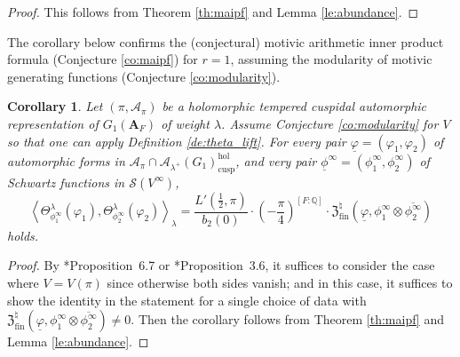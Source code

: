 \documentclass[12pt]{amsart}
\numberwithin{equation}{section}
\theoremstyle{plain}
\newtheorem{corollary}[proposition]{Corollary}
\theoremstyle{definition}
\theoremstyle{remark}
\renewcommand{\b}[1]{\mathbf{#1}}
\renewcommand{\c}[1]{\mathcal{#1}}
\renewcommand{\d}[1]{\mathbb{#1}}
\newcommand{\f}[1]{\mathfrak{#1}}
\renewcommand{\r}[1]{\mathrm{#1}}
\newcommand{\s}[1]{\mathscr{#1}}
\renewcommand{\(}{\left(}
\renewcommand{\)}{\right)}
\newcommand{\ol}[1]{\overline{#1}{}}
\newcommand{\ul}{\underline}
\newcommand{\bA}{\b A}
\newcommand{\cA}{\c A}
\newcommand{\dQ}{\d Q}
\newcommand{\fZ}{\f Z}
\newcommand{\sS}{\s S}
\newcommand{\llangle}{\left\langle}
\newcommand{\rrangle}{\right\rangle}
\newcommand{\cusp}{\r{cusp}}
\newcommand{\fin}{\r{fin}}
\newcommand{\hol}{\r{hol}}
\begin{document}
\begin{proof}
This follows from Theorem \ref{th:maipf} and Lemma \ref{le:abundance}.
\end{proof}


The corollary below confirms the (conjectural) motivic arithmetic inner product formula (Conjecture \ref{co:maipf}) for $r=1$, assuming the modularity of motivic generating functions (Conjecture \ref{co:modularity}).

\begin{corollary}\label{co:maipf_bis}
Let $(\pi,\cA_\pi)$ be a holomorphic tempered cuspidal automorphic representation of $G_1(\bA_F)$ of weight $\lambda$. Assume Conjecture \ref{co:modularity} for $V$ so that one can apply Definition \ref{de:theta_lift}. For every pair $\ul\varphi=(\varphi_1,\varphi_2)$ of automorphic forms in $\cA_\pi\cap\cA_{\lambda^+}(G_1)_\cusp^\hol$, and very pair $\ul\phi^\infty=(\phi^\infty_1,\phi^\infty_2)$ of Schwartz functions in $\sS(V^\infty)$,
\[
\llangle\Theta_{\phi^\infty_1}^\lambda(\varphi_1),\Theta_{\phi^\infty_2}^\lambda(\varphi_2)\rrangle_\lambda
=\frac{L'(\tfrac{1}{2},\pi)}{b_2(0)}\cdot \(-\frac{\pi}{4}\)^{[F:\dQ]}\cdot
\fZ^\natural_\fin(\ul\varphi,\phi^\infty_1\otimes\ol{\phi^\infty_2})
\]
holds.
\end{corollary}

\begin{proof}
By \cite{Liu12}*{Proposition~6.7} or \cite{LL21}*{Proposition~3.6}, it suffices to consider the case where $V=V(\pi)$ since otherwise both sides vanish; and in this case, it suffices to show the identity in the statement for a single choice of data with $\fZ^\natural_\fin(\ul\varphi,\phi^\infty_1\otimes\ol{\phi^\infty_2})\neq 0$. Then the corollary follows from Theorem \ref{th:maipf} and Lemma \ref{le:abundance}.
\end{proof}
\end{document}

